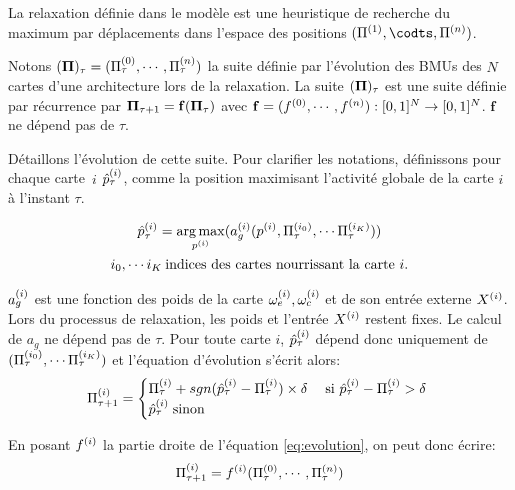 \documentclass[../main]{subfiles}
\begin{document}
La relaxation définie dans le modèle est une heuristique de recherche du maximum par déplacements dans l'espace des positions $(\bmu\m{1},\codts, \bmu\m{n})$.

Notons $(\mathbf{\Pi})_\tau = (\Pi^{({0})}_\tau,\cdots,\Pi^{({n})}_\tau)$ la suite définie par l'évolution des BMUs des $N$ cartes d'une architecture lors de la relaxation.
La suite $(\mathbf{\Pi})_\tau$ est une suite définie par récurrence par $\mathbf{\Pi}_{\tau+1} = \mathbf{f}(\mathbf{\Pi}_\tau)$ avec $\mathbf{f} = (f^{({0})},\cdots,f^{({n})}) : [0,1]^N \rightarrow [0,1]^N$. $\mathbf{f}$ ne dépend pas de $\tau$. 

Détaillons l'évolution de cette suite.
Pour clarifier les notations, définissons pour chaque carte~$i$ $\hat{p}^{({i})}_\tau$, comme la position maximisant l'activité globale de la carte $i$ à l'instant $\tau$.

\begin{equation}
\begin{gathered}
\hat{p}^{({i})}_{\tau} = \operatorname*{arg\,max}_{p^{({i})}}(a_g^{({i})}(p^{({i})},\Pi^{({i_0})}_\tau, \cdots \Pi^{({i_K})}_\tau))\\
 i_0, \cdots i_K \: \text{indices des cartes nourrissant la carte $i$}.
\end{gathered}
\label{eq:pstar}
\end{equation}

$a_g^{({i})}$ est une fonction des poids de la carte $\omega_{e}^{({i})}, \omega_{c}^{({i})}$ et de son entrée externe $X^{({i})}$. Lors du processus de relaxation, les poids et l'entrée $X^{({i})}$ restent fixes. Le calcul de $a_g$ ne dépend pas de $\tau$. Pour toute carte $i$, $\hat{p}^{({i})}_{\tau}$ dépend donc uniquement de $(\Pi^{({i_0})}_\tau, \cdots \Pi^{({i_K})}_\tau)$ et l'équation d'évolution s'écrit alors: 
\begin{equation}
\Pi^{({i})}_{\tau+1} = 
\begin{cases}
\Pi^{({i})}_{\tau} + sgn(\hat{p}^{({i})}_{\tau} - \Pi^{({i})}_{\tau}) \times \delta \; & \text{si $\hat{p}^{({i})}_{\tau} - \Pi^{({i})}_{\tau} > \delta$ } \\
\hat{p}^{({i})}_{\tau} \; \text{sinon}	
\end{cases}
\label{eq:evolution}
\end{equation}

En posant $f^{({i})}$ la partie droite de l'équation \ref{eq:evolution}, on peut donc écrire: 
\begin{equation}
\Pi^{({i})}_{\tau +1} = f^{({i})}(\Pi^{({0})}_\tau,\cdots,\Pi^{({n})}_\tau)
\label{eq:fonction}
\end{equation}
\end{document}
